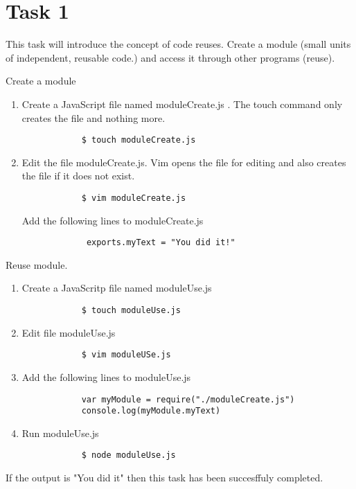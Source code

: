 \documentclass[12pt]{article}
\begin{document}
\section*{Task 1}
This task will introduce the concept of code reuses. Create a module (small units of independent, reusable code.) and access it through other programs (reuse). 
    \begin{todolist}
        \item Create a module 
        \begin{enumerate}
            \item Create a JavaScript file named moduleCreate.js . The touch command only creates the file and nothing more. 
            \begin{lstlisting}
            $ touch moduleCreate.js
            \end{lstlisting}
            \item Edit the file moduleCreate.js. Vim opens the file for editing and also creates the file if it does not exist. 
            \begin{lstlisting}
            $ vim moduleCreate.js
            \end{lstlisting}
            Add the following lines to moduleCreate.js 
            \begin{lstlisting}
             exports.myText = "You did it!" 
            \end{lstlisting}
        \end{enumerate}
        \item Reuse module. 
        \begin{enumerate}
            \item Create a JavaScritp file named moduleUse.js 
            \begin{lstlisting}
            $ touch moduleUse.js 
            \end{lstlisting}
            \item Edit  file moduleUse.js 
            \begin{lstlisting} 
            $ vim moduleUSe.js 
            \end{lstlisting}
            \item Add the following lines to moduleUse.js 
            \begin{lstlisting}
            var myModule = require("./moduleCreate.js")
            console.log(myModule.myText)
            \end{lstlisting}
            \item Run moduleUse.js 
            \begin{lstlisting}
            $ node moduleUse.js 
            \end{lstlisting}
        \end{enumerate}
        If the output is "You did it" then this task has been succesffuly completed. 
    \end{todolist}
\end{document}
